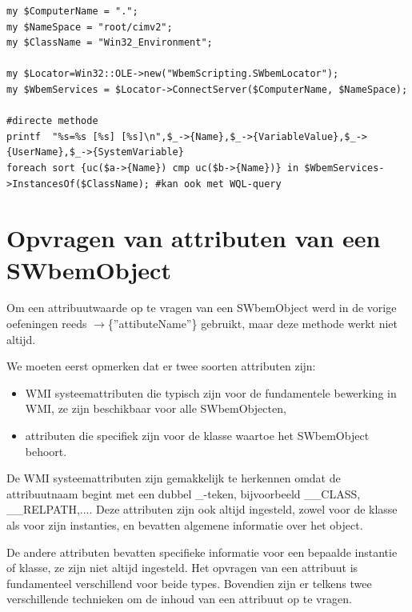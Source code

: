 \documentclass[11pt,a4paper]{report}
\begin{document}
\begin{enumerate}[resume]
\begin{lstlisting}
my $ComputerName = ".";
my $NameSpace = "root/cimv2";
my $ClassName = "Win32_Environment";

my $Locator=Win32::OLE->new("WbemScripting.SWbemLocator");
my $WbemServices = $Locator->ConnectServer($ComputerName, $NameSpace);

#directe methode
printf  "%s=%s [%s] [%s]\n",$_->{Name},$_->{VariableValue},$_->{UserName},$_->{SystemVariable}
foreach sort {uc($a->{Name}) cmp uc($b->{Name})} in $WbemServices->InstancesOf($ClassName); #kan ook met WQL-query
	\end{lstlisting}
\end{enumerate}
\section{Opvragen van attributen van een SWbemObject}
Om een attribuutwaarde op te vragen van een SWbemObject werd in de vorige oefeningen reeds $\rightarrow$\{''attibuteName''\} gebruikt, maar deze methode werkt niet altijd. 
\par We moeten eerst opmerken dat er twee soorten attributen zijn:
\begin{itemize}
	\item WMI systeemattributen die typisch zijn voor de fundamentele bewerking in WMI, ze zijn beschikbaar voor alle SWbemObjecten,
	\item attributen die specifiek zijn voor de klasse waartoe het SWbemObject behoort.
\end{itemize}

De WMI systeemattributen zijn gemakkelijk te herkennen omdat de attribuutnaam begint met een dubbel \_-teken, bijvoorbeeld \_\_CLASS, \_\_RELPATH,.... Deze attributen zijn ook altijd ingesteld, zowel voor de klasse als voor zijn instanties, en bevatten algemene informatie over het object.
\par De andere attributen bevatten specifieke informatie voor een bepaalde instantie of klasse, ze zijn niet altijd ingesteld. Het opvragen van een attribuut is fundamenteel verschillend voor beide types. Bovendien zijn er telkens twee verschillende technieken om de inhoud van een attribuut op te vragen.
\end{document}
